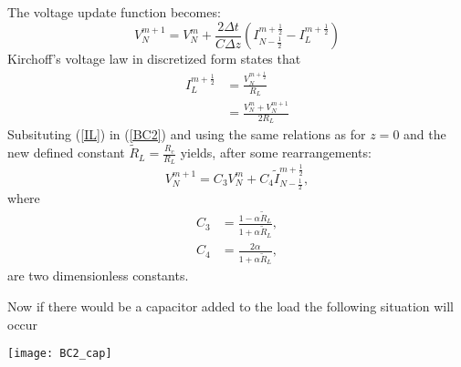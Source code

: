 \begin{itemize}
    The voltage update function becomes:
    \begin{equation}
        V^{m+1}_{N} = V^{m}_{N} + \frac{2\Delta t}{C\Delta z}\left(I^{m+\frac{1}{2}}_{N-\frac{1}{2}} - I^{m+\frac{1}{2}}_{L}\right)
        \label{BC2}
    \end{equation}
    Kirchoff's voltage law in discretized form states that
    \begin{align}
        I^{m+\frac{1}{2}}_{L} & = \frac{V^{m+\frac{1}{2}}_{N}}{R_{L}}\\
        & = \frac{V^{m}_{N}+V^{m+1}_{N}}{2R_{L}}
        \label{IL}
    \end{align}
    Subsituting (\ref{IL}) in (\ref{BC2}) and using the same relations as for $z=0$ and the new defined constant $\tilde{R}_{L} = \frac{R_c}{R_L}$ yields, 
    after some rearrangements:
    \begin{equation}
        V^{m+1}_{N} = C_{3}V^{m}_N + C_{4}\tilde{I}^{m+\frac{1}{2}}_{N-\frac{1}{2}},
    \end{equation}
    where
    \begin{align}
        C_{3} & = \frac{1-\alpha\tilde{R}_{L}}{1+\alpha\tilde{R}_{L}},\\
        C_{4} & = \frac{2\alpha}{1+\alpha\tilde{R}_{L}},
    \end{align}
    are two dimensionless constants.

    Now if there would be a capacitor added to the load the following situation will occur
    
    \begin{center}
    \texttt{[image: BC2\_cap]}
    \end{center}
    

\end{itemize}
